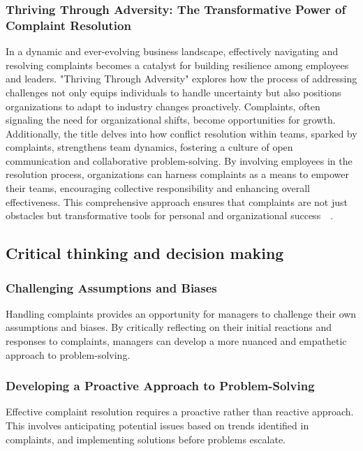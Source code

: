 \documentclass[runningheads]{llncs}
\begin{document}
\subsubsection{Thriving Through Adversity: The Transformative Power of Complaint Resolution}
In a dynamic and ever-evolving business landscape, effectively navigating and resolving complaints becomes a catalyst for building resilience among employees and leaders. "Thriving Through Adversity" explores how the process of addressing challenges not only equips individuals to handle uncertainty but also positions organizations to adapt to industry changes proactively. Complaints, often signaling the need for organizational shifts, become opportunities for growth. Additionally, the title delves into how conflict resolution within teams, sparked by complaints, strengthens team dynamics, fostering a culture of open communication and collaborative problem-solving. By involving employees in the resolution process, organizations can harness complaints as a means to empower their teams, encouraging collective responsibility and enhancing overall effectiveness. This comprehensive approach ensures that complaints are not just obstacles but transformative tools for personal and organizational success~\cite{levy2002effect}~\cite{morrison2011employee}.

\subsection{Critical thinking and decision making}
\subsubsection{Challenging Assumptions and Biases}
Handling complaints provides an opportunity for managers to challenge their own assumptions and biases. By critically reflecting on their initial reactions and responses to complaints, managers can develop a more nuanced and empathetic approach to problem-solving.

\subsubsection{Developing a Proactive Approach to Problem-Solving}
Effective complaint resolution requires a proactive rather than reactive approach. This involves anticipating potential issues based on trends identified in complaints, and implementing solutions before problems escalate. 
\end{document}
